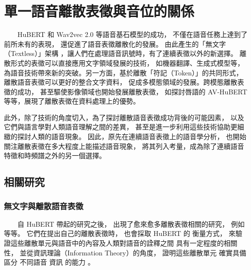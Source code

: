 


\chapter{單一語音離散表徵與音位的關係}  %

　　HuBERT \cite{hsu_hubert_2021, hsu_hubert_2021-2} 和 Wav2vec 2.0 \cite{baevski2020wav2vec} 等語音基石模型的成功，
不僅在語音任務上達到了前所未有的表現，
還促進了語音表徵離散化的發展。
由此產生的「無文字（Textless）」架構 \cite{noauthor_textless_2021, lakhotia_generative_2021, lakhotia_generative_2021-1}，讓人們在處理語音訊號時，有了連續表徵以外的新選擇。
離散形式的表徵可以直接應用文字領域發展的技術，
如機器翻譯、生成式模型等，為語音技術帶來新的突破。另一方面，基於離散「符記（Token）」的共同形式，
離散語音表徵可以更好的整合文字資料，
促成多模態領域的發展。跨模態離散表徵的成功，
甚至驅使影像領域也開始發展離散表徵，  %
如探討唇語的 AV-HuBERT \cite{shi2021learning} 等等，展現了離散表徵在資料處理上的優勢。

此外，除了技術的角度切入，為了探討離散語音表徵成功背後的可能因素，
以及它們與語言學對人類語音理解之間的差異，
甚至是進一步利用這些技術協助更細緻的探討人類的語音現象。
因此，原先在連續語音表徵上的語音學分析，
也開始關注離散表徵在多大程度上能描述語音現象，
將其列入考量，成為除了連續語音特徵和時頻譜之外的另一個選擇。

\section{相關研究}

\subsection{無文字與離散語音表徵}

　　自 HuBERT 帶起的研究之後，
出現了愈來愈多離散表徵相關的研究，
例如 \cite{10097097, abdullah23_interspeech, chang_exploration_2023, liu2024dinosr, zhang2024speechtokenizer, huang2023repcodec} 等等。
它們在提出自己的離散表徵時，
也會採取 HuBERT 的
衡量方式，
來驗證這些離散單元與語音中的內容及人類對語音的詮釋之間
具有一定程度的相關性，
並從資訊理論（Information Theory）的角度，
證明這些離散單元
確實具備區分
不同語音
資訊
的能力
。


